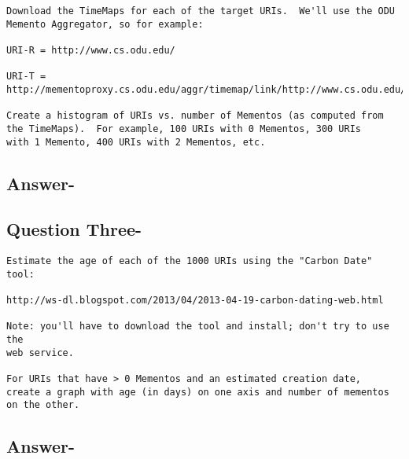 \documentclass[letterpaper,11pt]{article}
\begin{document}
\begin{verbatim}
Download the TimeMaps for each of the target URIs.  We'll use the ODU 
Memento Aggregator, so for example:

URI-R = http://www.cs.odu.edu/

URI-T = http://mementoproxy.cs.odu.edu/aggr/timemap/link/http://www.cs.odu.edu/

Create a histogram of URIs vs. number of Mementos (as computed from
the TimeMaps).  For example, 100 URIs with 0 Mementos, 300 URIs
with 1 Memento, 400 URIs with 2 Mementos, etc.
\end{verbatim}
\subsection*{Answer-}
\newpage



\subsection*{Question Three-}

\begin{verbatim}
Estimate the age of each of the 1000 URIs using the "Carbon Date" tool:

http://ws-dl.blogspot.com/2013/04/2013-04-19-carbon-dating-web.html

Note: you'll have to download the tool and install; don't try to use the 
web service.  

For URIs that have > 0 Mementos and an estimated creation date,
create a graph with age (in days) on one axis and number of mementos
on the other.
\end{verbatim}
\subsection*{Answer-}
\end{document}
